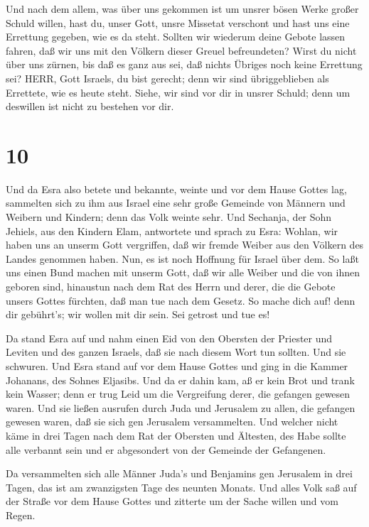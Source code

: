  Und nach dem allem, was über uns gekommen ist um unsrer
bösen Werke großer Schuld willen, hast du, unser Gott, unsre Missetat
verschont und hast uns eine Errettung gegeben, wie es da steht.
 Sollten wir wiederum deine Gebote lassen fahren, daß wir
uns mit den Völkern dieser Greuel befreundeten? Wirst du nicht über uns
zürnen, bis daß es ganz aus sei, daß nichts Übriges noch keine Errettung
sei?  HERR, Gott Israels, du bist gerecht; denn wir sind
übriggeblieben als Errettete, wie es heute steht. Siehe, wir sind vor
dir in unsrer Schuld; denn um deswillen ist nicht zu bestehen vor dir.

\hypertarget{section-9}{%
\section{10}\label{section-9}}

 Und da Esra also betete und bekannte, weinte und vor dem
Hause Gottes lag, sammelten sich zu ihm aus Israel eine sehr große
Gemeinde von Männern und Weibern und Kindern; denn das Volk weinte sehr.
 Und Sechanja, der Sohn Jehiels, aus den Kindern Elam,
antwortete und sprach zu Esra: Wohlan, wir haben uns an unserm Gott
vergriffen, daß wir fremde Weiber aus den Völkern des Landes genommen
haben. Nun, es ist noch Hoffnung für Israel über dem.  So
laßt uns einen Bund machen mit unserm Gott, daß wir alle Weiber und die
von ihnen geboren sind, hinaustun nach dem Rat des Herrn und derer, die
die Gebote unsers Gottes fürchten, daß man tue nach dem Gesetz.
 So mache dich auf! denn dir gebührt's; wir wollen mit dir
sein. Sei getrost und tue es!

 Da stand Esra auf und nahm einen Eid von den Obersten der
Priester und Leviten und des ganzen Israels, daß sie nach diesem Wort
tun sollten. Und sie schwuren.  Und Esra stand auf vor dem
Hause Gottes und ging in die Kammer Johanans, des Sohnes Eljasibs. Und
da er dahin kam, aß er kein Brot und trank kein Wasser; denn er trug
Leid um die Vergreifung derer, die gefangen gewesen waren. 
Und sie ließen ausrufen durch Juda und Jerusalem zu allen, die gefangen
gewesen waren, daß sie sich gen Jerusalem versammelten.  Und
welcher nicht käme in drei Tagen nach dem Rat der Obersten und Ältesten,
des Habe sollte alle verbannt sein und er abgesondert von der Gemeinde
der Gefangenen.

 Da versammelten sich alle Männer Juda's und Benjamins gen
Jerusalem in drei Tagen, das ist am zwanzigsten Tage des neunten Monats.
Und alles Volk saß auf der Straße vor dem Hause Gottes und zitterte um
der Sache willen und vom Regen.

